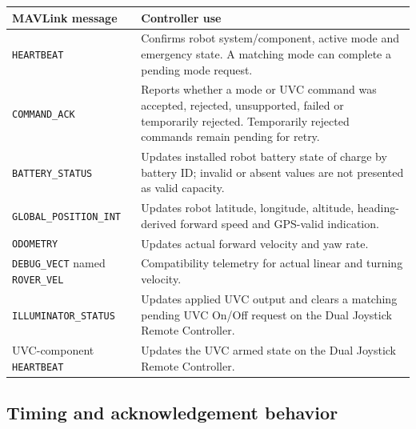 \documentclass[
  10pt,
  letterpaper,
  openany]{report}
\newcounter{none} %
\begin{document}
{\def\LTcaptype{none} %
\begin{longtable}[]{@{}
  >{\raggedright\arraybackslash}p{}
  >{\raggedright\arraybackslash}p{}@{}}
\toprule\noalign{}
\begin{minipage}[b]{\linewidth}\raggedright
MAVLink message
\end{minipage} & \begin{minipage}[b]{\linewidth}\raggedright
Controller use
\end{minipage} \\
\midrule\noalign{}
\endhead
\bottomrule\noalign{}
\endlastfoot
\texttt{HEARTBEAT} & Confirms robot system/component, active mode and
emergency state. A matching mode can complete a pending mode request. \\
\texttt{COMMAND\_ACK} & Reports whether a mode or UVC command was
accepted, rejected, unsupported, failed or temporarily rejected.
Temporarily rejected commands remain pending for retry. \\
\texttt{BATTERY\_STATUS} & Updates installed robot battery state of
charge by battery ID; invalid or absent values are not presented as
valid capacity. \\
\texttt{GLOBAL\_POSITION\_INT} & Updates robot latitude, longitude,
altitude, heading-derived forward speed and GPS-valid indication. \\
\texttt{ODOMETRY} & Updates actual forward velocity and yaw rate. \\
\texttt{DEBUG\_VECT} named \texttt{ROVER\_VEL} & Compatibility telemetry
for actual linear and turning velocity. \\
\texttt{ILLUMINATOR\_STATUS} & Updates applied UVC output and clears a
matching pending UVC On/Off request on the Dual Joystick Remote
Controller. \\
UVC-component \texttt{HEARTBEAT} & Updates the UVC armed state on the
Dual Joystick Remote Controller. \\
\end{longtable}
}

\subsection{Timing and acknowledgement
behavior}\label{timing-and-acknowledgement-behavior}
\end{document}
